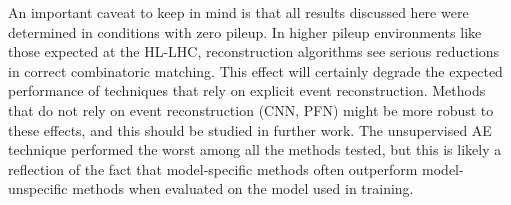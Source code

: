 An important caveat to keep in mind is that all results discussed here were determined in conditions with zero pileup. In higher pileup environments like those expected at the HL-LHC, reconstruction algorithms see serious reductions in correct combinatoric matching. This effect will certainly degrade the expected performance of techniques that rely on explicit event reconstruction. Methods that do not rely on event reconstruction (CNN, PFN) might be more robust to these effects, and this should be studied in further work. The unsupervised AE technique performed the worst among all the methods tested, but this is likely a reflection of the fact that model-specific methods often outperform model-unspecific methods when evaluated on the model used in training.

